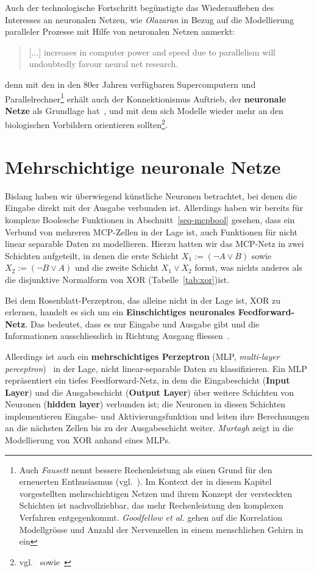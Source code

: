 Auch der technologische Fortschritt begünstigte das Wiederaufleben des Interesses an neuronalen Netzen, wie \textit{Olazaran} in Bezug auf die Modellierung paralleler Prozesse mit Hilfe von neuronalen Netzen anmerkt:

\blockquote[{\cite[644]{Ola96}}]{
    [...] increases in computer power and speed due to parallelism will undoubtedly favour neural net research.
}

denn mit den in den 80er Jahren verfügbaren Supercomputern und Parallelrechner\footnote{
    Auch \textit{Fausett} nennt bessere Rechenleistung als einen Grund für den erneuerten Enthusiasmus (vgl.~\cite[26]{Fau94}). Im Kontext der in diesem Kapitel vorgestellten mehrschichtigen Netzen und ihrem Konzept der versteckten Schichten ist nachvollziehbar, das mehr Rechenleistung den komplexen Verfahren entgegenkommt. \textit{Goodfellow et al.} gehen auf die Korrelation Modellgrösse und Anzahl der Nervenzellen in einem menschlichen Gehirn in~\cite[24 f.]{GBC18} ein
} erhält auch der Konnektionismus Auftrieb, der \textbf{neuronale Netze} als Grundlage hat~\cite[15]{Dor91}, und mit dem sich Modelle wieder mehr an den biologischen Vorbildern orientieren sollten\footnote{
    vgl.~\cite[43]{RM87} sowie~\cite[18 f.]{GBC18}}.


\section{Mehrschichtige neuronale Netze}

Bislang haben wir überwiegend künstliche Neuronen betrachtet, bei denen die Eingabe direkt mit der Ausgabe verbunden ist. Allerdings haben wir bereits für komplexe Boolesche Funktionen in Abschnitt~\ref{seq-mcpbool} gesehen, dass ein Verbund von mehreren MCP-Zellen in der Lage ist, auch Funktionen für nicht linear separable Daten zu modellieren. Hierzu hatten wir das MCP-Netz in zwei Schichten aufgeteilt, in denen die erste Schicht $X_1 := (\neg A \lor B)$ sowie $X_2 := (\neg B \lor A)$ und die zweite Schicht $X_1 \lor X_2$ formt, was nichts anderes als die disjunktive Normalform von XOR (Tabelle~\ref{tab:xor})ist.

Bei dem Rosenblatt-Perzeptron, das alleine nicht in der Lage ist, XOR zu erlernen, handelt es sich um ein \textbf{Einschichtiges neuronales Feedforward-Netz}.
Das bedeutet, dass es nur Eingabe und Ausgabe gibt und die Informationen ausschliesslich in Richtung Ausgang fliessen~\cite[848]{RN09}.

Allerdings ist auch ein \textbf{mehrschichtiges Perzeptron} (MLP, \textit{multi-layer perceptron})~\cite[6]{GBC18} in der Lage, nicht linear-separable Daten zu klassifizieren.
Ein MLP repräsentiert ein tiefes Feedforward-Netz, in dem die Eingabeschicht (\textbf{Input Layer}) und die Ausgabeschicht (\textbf{Output Layer}) über weitere Schichten von Neuronen (\textbf{hidden layer}) verbunden ist; die Neuronen in diesen Schichten implementieren Eingabe- und Aktivierungsfunktion und leiten ihre Berechnungen an die nächsten Zellen bis zu der Ausgabeschicht weiter. \textit{Murtagh} zeigt in \cite[184 f.]{Mur91} die Modellierung von XOR anhand eines MLPs.

